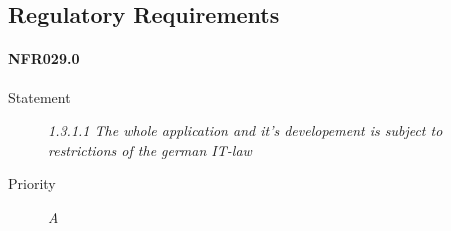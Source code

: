 \subsection{Regulatory Requirements}

\paragraph{NFR029.0}
\begin{description}
\item [Statement] \textit{
1.3.1.1 The whole application and it’s developement is subject to restrictions of the german IT-law
}
\item [Priority] \textit{A}
\end{description}
